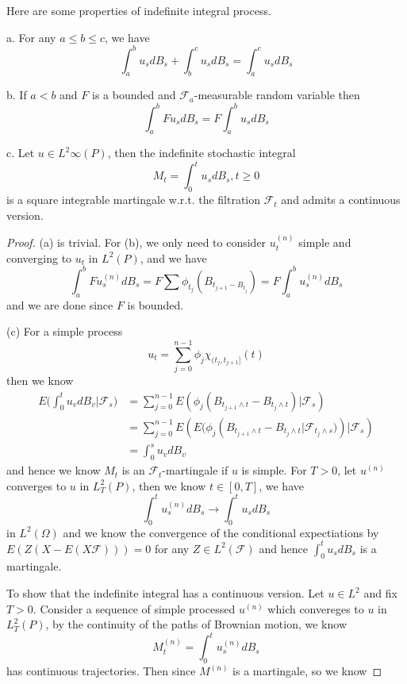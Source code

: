 \documentclass[lang=en, color=blue, ]{elegantbook}
\newcommand{\F}{\mathcal{F}}
\begin{document}
\begin{proposition}
    Here are some properties of indefinite integral process.\par
    a. For any $a\leq b \leq c$, we have
    \[
    \int_a^b u_s dB_s + \int_b^c u_s dB_s = \int_a^c u_s dB_s
    \]\par
    b. If $a<b$ and $F$ is a bounded and $\F_a$-measurable random variable then
    \[
    \int_a^b Fu_sdB_s = F\int_a^b u_s dB_s
    \]\par
    c. Let $u\in L^2{\infty}(P)$, then the indefinite stochastic integral
    \[
    M_t = \int_0^t u_sdB_s, t\geq 0
    \]
    is a square integrable martingale w.r.t. the filtration $\F_t$ and admits a continuous version.
\end{proposition}

\begin{proof}
    (a) is trivial. For (b), we only need to consider $u_t^{(n)}$ simple and converging to $u_t$ in $L^2(P)$, and we have
    \[
    \int_a^b Fu_s^{(n)}dB_s = F\sum\phi_{t_j}(B_{t_{j+1}-B_{t_j}}) = F\int_a^b u_s^{(n)}dB_s
    \]
    and we are done since $F$ is bounded.\par
    (c) For a simple process
    \[
    u_t = \sum\limits_{j=0}^{n-1}\phi_j \chi_{(t_j,t_{j+1}]}(t)
    \]
    then we know
    \[
    \begin{aligned}
    E\Big(\int_0^t u_vdB_v\Big| \F_s\Big) &= \sum\limits_{j=0}^{n-1}E(\phi_j(B_{t_{j+1}\wedge t} - B_{t_j\wedge t})\Big|\F_s) \\
    &= \sum\limits_{j=0}^{n-1}E(E\Big(\phi_j(B_{t_{j+1}\wedge t} - B_{t_j\wedge t}\Big|\F_{t_j \wedge s}\Big))\Big|\F_s) \\
    &= \int_0^s u_v dB_v
    \end{aligned}
    \]
    and hence we know $M_t$ is an $\F_t$-martingale if $u$ is simple. For $T>0$, let $u^{(n)}$ converges to $u$ in $L^2_T(P)$, then we know $t\in [0,T]$, we have
    \[
    \int_0^t u_s^{(n)} dB_s \to \int_0^t u_s dB_s
    \]
    in $L^2(\Omega)$ and we know the convergence of the conditional expectiations by $E(Z(X-E(X\F))) = 0$ for any $Z\in L^2(\F)$ and hence $\int_0^t u_s dB_s$ is a martingale.\par
    To show that the indefinite integral has a continuous version. Let $u\in L^2$ and fix $T>0$. Consider a sequence of simple processed $u^{(n)}$ which convereges to $u$ in $L^2_T(P)$, by the continuity of the paths of Brownian motion, we know
    \[
    M_t^{(n)} = \int_0^t u_s^{(n)}dB_s
    \]
    has continuous trajectories. Then  since $M^{(n)}$ is a martingale, so we know

\end{proof}
\end{document}

